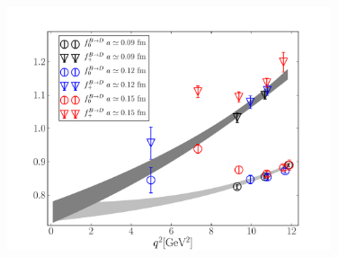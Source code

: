 
\begin{figure}
  \vspace{-20pt}
  \begin{center}
    \includegraphics[width=0.85\textwidth]{images/NRQCD/new/BD_formfactors.pdf}
  \end{center}
  \caption{}
  \vspace{-20pt}
\end{figure}

